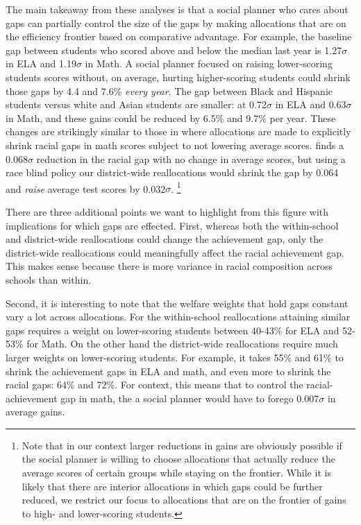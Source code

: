 \documentclass[12pt]{article}
\theoremstyle{definition}
\theoremstyle{definition}
\theoremstyle{definition}
\theoremstyle{definition}
\begin{document}
The main takeaway from these analyses is that a social planner who cares about gaps can partially control the size of the gaps by making allocations that are on the efficiency frontier based on comparative advantage. For example, the baseline gap between students who scored above and below the median last year is 1.27$\sigma$ in ELA and 1.19$\sigma$ in Math. A social planner focused on raising lower-scoring students scores without, on average, hurting higher-scoring students could shrink those gaps by 4.4 and 7.6\% \textit{every year}. The gap between Black and Hispanic students versus white and Asian students are smaller: at 0.72$\sigma$ in ELA and 0.63$\sigma$ in Math, and these gains could be reduced by 6.5\% and 9.7\% per year. These changes are strikingly similar to those in \citet{Delgado2020} where allocations are made to explicitly shrink racial gaps in math scores subject to not lowering average scores.\citet{Delgado2020} finds a 0.068$\sigma$ reduction in the racial gap with no change in average scores, but using a race blind policy our district-wide reallocations would shrink the gap by 0.064 and \textit{raise} average test scores by 0.032$\sigma$. \footnote{Note that in our context larger reductions in gains are obviously possible if the social planner is willing to choose allocations that actually reduce the average scores of certain groups while staying on the frontier. While it is likely that there are interior allocations in which gaps could be further reduced, we restrict our focus to allocations that are on the frontier of gains to high- and lower-scoring students.} 

There are three additional points we want to highlight from this figure with implications for which gaps are effected. First,  whereas both the within-school and district-wide reallocations could change the achievement gap, only the district-wide reallocations could meaningfully affect the racial achievement gap. This makes sense because there is more variance in racial composition across schools than within. 

Second, it is interesting to note that the welfare weights that hold gaps constant vary a lot across allocations. For the within-school reallocations attaining similar gaps requires a weight on lower-scoring students between 40-43\% for ELA and 52-53\% for Math. On the other hand the district-wide reallocations require much larger weights on lower-scoring students. For example, it takes 55\% and 61\% to shrink the achievement gaps in ELA and math, and even more to shrink the racial gaps: 64\% and 72\%. For context, this means that to control the racial-achievement gap in math, the a social planner would have to forego 0.007$\sigma$ in average gains.
\end{document}
